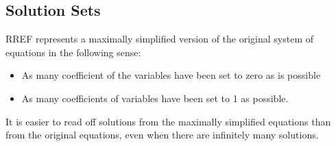 \subsection{Solution Sets}
RREF represents a maximally simplified version of the original system of equations in the following sense: 
\begin{itemize}
\item As many coefficient of the variables have been set to zero as is possible 
\item As many coefficients of variables have been set to 1 as possible.
\end{itemize}
It is easier to read off solutions from the maximally simplified equations than from the original equations, even when there are infinitely many solutions.

